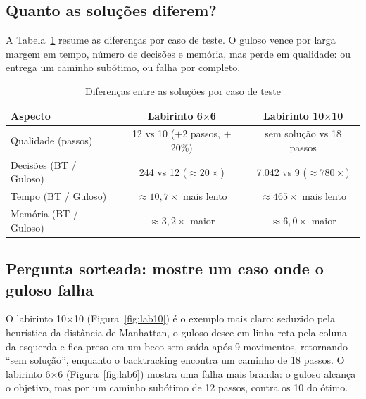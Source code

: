 \documentclass[12pt, a4paper, brazil]{article}
\begin{document}
\subsection{Quanto as soluções diferem?}
A Tabela~\ref{tab:diferencas} resume as diferenças por caso de teste. O guloso vence por larga margem em tempo, número de decisões e memória, mas perde em qualidade: ou entrega um caminho subótimo, ou falha por completo.

\begin{table}[H]
\centering
\caption{Diferenças entre as soluções por caso de teste}
\label{tab:diferencas}
\begin{tabular}{lcc}
\toprule
\textbf{Aspecto} & \textbf{Labirinto 6$\times$6} & \textbf{Labirinto 10$\times$10} \\
\midrule
Qualidade (passos)        & 12 vs 10 ($+$2 passos, $+$20\%)          & sem solução vs 18 passos \\
Decisões (BT / Guloso)    & 244 vs 12 ($\approx 20\times$)          & 7.042 vs 9 ($\approx 780\times$) \\
Tempo (BT / Guloso)       & $\approx 10{,}7\times$ mais lento       & $\approx 465\times$ mais lento \\
Memória (BT / Guloso)     & $\approx 3{,}2\times$ maior             & $\approx 6{,}0\times$ maior \\
\bottomrule
\end{tabular}
\end{table}

\subsection{Pergunta sorteada: mostre um caso onde o guloso falha}
O labirinto 10$\times$10 (Figura~\ref{fig:lab10}) é o exemplo mais claro: seduzido pela heurística da distância de Manhattan, o guloso desce em linha reta pela coluna da esquerda e fica preso em um beco sem saída após 9 movimentos, retornando ``sem solução'', enquanto o backtracking encontra um caminho de 18 passos. O labirinto 6$\times$6 (Figura~\ref{fig:lab6}) mostra uma falha mais branda: o guloso alcança o objetivo, mas por um caminho subótimo de 12 passos, contra os 10 do ótimo.
\end{document}
